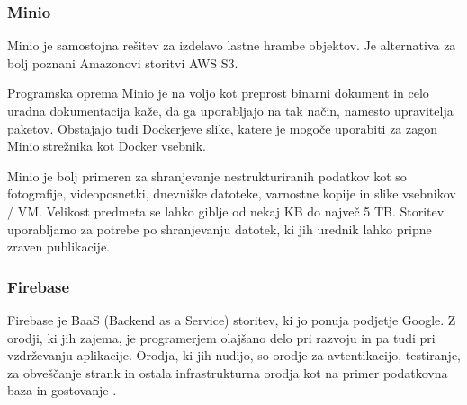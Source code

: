 


\subsubsection{Minio}
\label{minio-what}
Minio je samostojna rešitev za izdelavo lastne hrambe objektov. Je alternativa za bolj poznani Amazonovi storitvi AWS S3.

Programska oprema Minio je na voljo kot preprost binarni dokument in celo uradna dokumentacija kaže, da ga uporabljajo na tak način, namesto upravitelja paketov. Obstajajo tudi Dockerjeve slike, katere je mogoče uporabiti za zagon Minio strežnika kot Docker vsebnik.

Minio je bolj primeren za shranjevanje nestrukturiranih podatkov kot so fotografije, videoposnetki, dnevniške datoteke, varnostne kopije in slike vsebnikov / VM. Velikost predmeta se lahko giblje od nekaj KB do največ 5 TB. Storitev uporabljamo za potrebe po shranjevanju datotek, ki jih urednik lahko pripne zraven publikacije.



\subsubsection{Firebase}
Firebase je BaaS (Backend as a Service) storitev, ki jo ponuja podjetje Google. Z orodji, ki jih zajema, je programerjem olajšano delo pri razvoju in pa tudi pri vzdrževanju aplikacije. Orodja, ki jih nudijo, so orodje za avtentikacijo, testiranje, za obveščanje strank in ostala infrastrukturna orodja kot na primer podatkovna baza in gostovanje \cite{firebase-about}.

